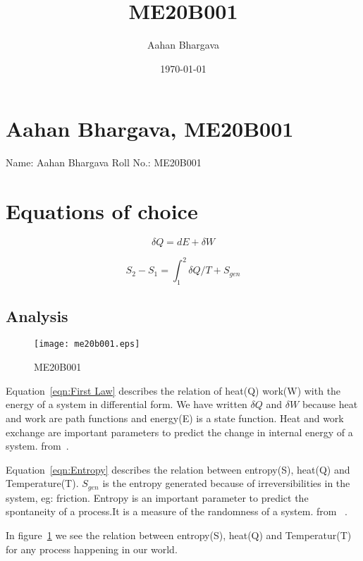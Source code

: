 \documentclass[a4paper, 12pt]{article}
\begin{document}
\title{ME20B001}
\author{Aahan Bhargava}
\date{\today}
\maketitle

\tableofcontents

\listoffigures

\section{Aahan Bhargava, ME20B001}
Name: Aahan Bhargava
Roll No.: ME20B001

\section{Equations of choice}
\begin{equation}
\delta Q = dE + \delta W	
\label{eqn:First Law}
\end{equation}

\begin{equation}
S_2-S_1 = \int_{1}^{2}{\delta Q/T} + S_{gen}
\label{eqn:Entropy}
\end{equation}

\subsection{Analysis}
\begin{figure}[h]
	\begin{center}
		\texttt{[image: me20b001.eps]}
	\end{center}
	\caption{ME20B001}
	\label{entropy}
\end{figure}

Equation~\ref{eqn:First Law} describes the relation of heat(Q) 
work(W) with the energy of a system in differential form.
We have written $ \delta Q $ and $ \delta W $ because heat and work are path functions
and energy(E) is a state function.
Heat and work exchange are important parameters to predict the change in internal energy
of a system.
from~\cite{Myers}.

Equation~\ref{eqn:Entropy} describes the relation between entropy(S), heat(Q)
and Temperature(T). $ S_{gen} $ is the entropy generated because of
irreversibilities in the system, eg: friction.
Entropy is an important parameter to predict the spontaneity of a process.It is a measure
of the randomness of a system.
from ~\cite{Bejan}.

In figure~\ref{entropy} we see the relation between entropy(S), heat(Q) and
Temperatur(T) for any process happening in our world.
 


\end{document}
